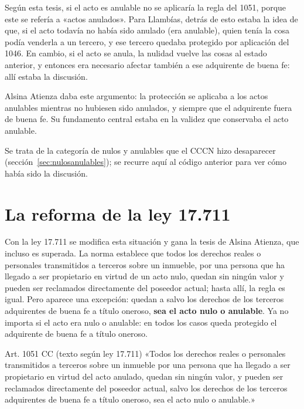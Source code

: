 \documentclass[12pt,oneside]{book}
\begin{document}
Según esta tesis, si el acto es anulable no se aplicaría la regla del 1051, porque este se refería a «actos anulados». Para Llambías, detrás de esto estaba la idea de que, si el acto todavía no había sido anulado (era anulable), quien tenía la cosa podía venderla a un tercero, y ese tercero quedaba protegido por aplicación del 1046. En cambio, si el acto se anula, la nulidad vuelve las cosas al estado anterior, y entonces era necesario afectar también a ese adquirente de buena fe: allí estaba la discusión.

Alsina Atienza daba este argumento: la protección se aplicaba a los actos anulables mientras no hubiesen sido anulados, y siempre que el adquirente fuera de buena fe. Su fundamento central estaba en la validez que conservaba el acto anulable.

Se trata de la categoría de nulos y anulables que el CCCN hizo desaparecer (sección~\ref{sec:nulosanulables}); se recurre aquí al código anterior para ver cómo había sido la discusión.

\section{La reforma de la ley 17.711}

Con la ley 17.711 se modifica esta situación y gana la tesis de Alsina Atienza, que incluso es superada. La norma establece que todos los derechos reales o personales transmitidos a terceros sobre un inmueble, por una persona que ha llegado a ser propietario en virtud de un acto nulo, quedan sin ningún valor y pueden ser reclamados directamente del poseedor actual; hasta allí, la regla es igual. Pero aparece una excepción: quedan a salvo los derechos de los terceros adquirentes de buena fe a título oneroso, \textbf{sea el acto nulo o anulable}. Ya no importa si el acto era nulo o anulable: en todos los casos queda protegido el adquirente de buena fe a título oneroso.

\begin{articulo}{Art. 1051 CC (texto según ley 17.711)}
«Todos los derechos reales o personales transmitidos a terceros sobre un inmueble por una persona que ha llegado a ser propietario en virtud del acto anulado, quedan sin ningún valor, y pueden ser reclamados directamente del poseedor actual, salvo los derechos de los terceros adquirentes de buena fe a título oneroso, sea el acto nulo o anulable.»
\end{articulo}
\end{document}
